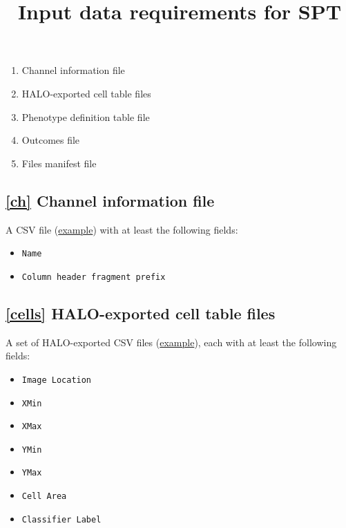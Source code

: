 \documentclass[14pt]{article}
\begin{document}
\title{Input data requirements for SPT }
\author{}
\maketitle

\begin{center}
\begin{varwidth}{0.4\textwidth}
\begin{enumerate}
  \itemsep0em
  \item{\label{ch}Channel information file}
  \item{\label{cells}HALO-exported cell table files}
  \item{\label{pheno}Phenotype definition table file}
  \item{\label{outcomes}Outcomes file}
  \item{\label{files}Files manifest file}
\end{enumerate}
\end{varwidth}
\end{center}

\newpage

\subsection*{\ref{ch} Channel information file}
A CSV file (\href{https://github.com/nadeemlab/SPT/blob/main/tests/data/elementary_phenotypes.csv}{example})
 with at least the following fields:

\begin{itemize}
  \itemsep0em
  \item[]{\colorbox{yellow!25}{\texttt{Name}}}
  \item[]{\colorbox{yellow!25}{\texttt{Column header fragment prefix}}}
\end{itemize}

\subsection*{\ref{cells} HALO-exported cell table files} A set of HALO-exported CSV files (\href{https://github.com/nadeemlab/SPT/blob/main/tests/data/2779f21192cb0ce1479b2bf7fb20ebba.csv}{example}), each with at least the following fields:

\begin{itemize}
  \itemsep0em
  \item[]{\colorbox{yellow!25}{\texttt{Image Location}}}
  \item[]{\colorbox{yellow!25}{\texttt{XMin}}}
  \item[]{\colorbox{yellow!25}{\texttt{XMax}}}
  \item[]{\colorbox{yellow!25}{\texttt{YMin}}}
  \item[]{\colorbox{yellow!25}{\texttt{YMax}}}
  \item[]{\colorbox{yellow!25}{\texttt{Cell Area}}}
  \item[]{\colorbox{yellow!25}{\texttt{Classifier Label}}}
\end{itemize}
\end{document}
